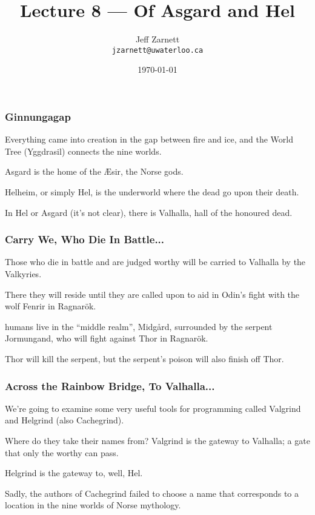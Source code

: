 

\title{Lecture 8 --- Of Asgard and Hel }

\author{Jeff Zarnett \\ \small \texttt{jzarnett@uwaterloo.ca}}
\date{\today}




\begin{frame}
  \titlepage

 \end{frame}

\begin{frame}
\frametitle{Ginnungagap}

Everything came into creation in the gap between fire and ice, and the World Tree (Yggdrasil) connects the nine worlds. 

Asgard is the home of the \AE sir, the Norse gods. 

Helheim, or simply Hel, is the underworld where the dead go upon their death. 

 In Hel or Asgard (it's not clear), there is Valhalla, hall of the honoured dead. 

\end{frame}

\begin{frame}
\frametitle{Carry We, Who Die In Battle...}

Those who die in battle and are judged worthy will be carried to Valhalla by the Valkyries. 

There they will reside until they are called upon to aid in Odin's fight with the wolf Fenrir in Ragnar\"ok.

humans live in the ``middle realm'', Midg\aa rd, surrounded by the serpent Jormungand, who will fight against Thor in  Ragnar\"ok. 

Thor will kill the serpent, but the serpent's poison will also finish off Thor.

\end{frame}

\begin{frame}
\frametitle{Across the Rainbow Bridge, To Valhalla...}

We're going to examine some very useful tools for programming called Valgrind and Helgrind (also Cachegrind).

Where do they take their names from? Valgrind is the gateway to Valhalla; a gate that only the worthy can pass. 

Helgrind is the gateway to, well, Hel. 

 Sadly, the authors of Cachegrind failed to choose a name that corresponds to a location in the nine worlds of Norse mythology. 

\end{frame}

